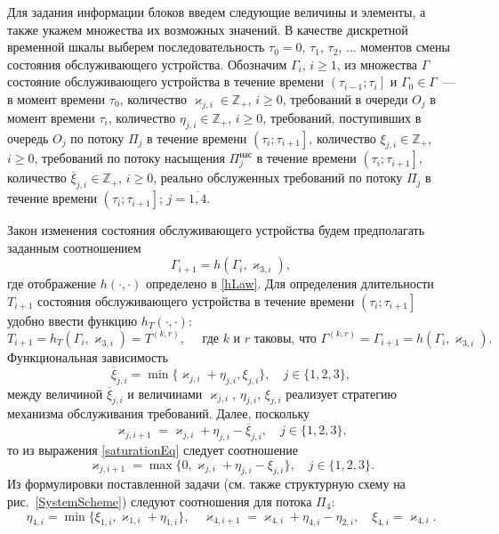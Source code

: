 \documentclass{report}
\begin{document}
Для задания информации блоков введем следующие величины и элементы, а также укажем множества их возможных значений. В качестве дискретной временной шкалы выберем последовательность $\tau_0=0$, $\tau_1$, $\tau_2$, $\ldots$ моментов смены состояния обслуживающего устройства. Обозначим $\Gamma_i$, $i\geqslant 1$, из множества $\Gamma$ состояние обслуживающего устройства в течение времени $\left(\tau_{i-1};\tau_i\right]$ и $\Gamma_0\in \Gamma$~--- в момент времени $\tau_0$, количество $\varkappa_{j,i} \in \mathbb{Z}_+ $, $i\geqslant 0$, требований в очереди $O_j$ в момент времени $\tau_i$, количество $\eta_{j,i} \in \mathbb{Z}_+$, $i\geqslant 0$, требований, поступивших в очередь $O_j$ по потоку $\Pi_j$ в течение времени $\left(\tau_{i};\tau_{i+1}\right]$, количество $\xi_{j,i} \in \mathbb{Z}_+$, $i\geqslant 0$, требований по потоку насыщения $\Pi^{\mathrm{\text{нас}}}_j$ в течение времени $\left(\tau_{i};\tau_{i+1}\right]$, количество $\overline{\xi}_{j,i}\in \mathbb{Z}_+$, $i\geqslant 0$, реально обслуженных требований по потоку $\Pi_j$ в течение времени $\left(\tau_{i};\tau_{i+1}\right]$; $j=\overline{1,4}$.

Закон изменения состояния обслуживающего устройства будем предполагать заданным соотношением 
\begin{equation}
\Gamma_{i+1}=h(\Gamma_i,\varkappa_{3,i}),
\label{gammaFunc}
\end{equation}
где отображение $h(\cdot,\cdot)$ определено в \eqref{hLaw}.
Для определения длительности $T_{i+1}$ состояния обслуживающего устройства в течение времени $\left(\tau_{i};\tau_{i+1}\right]$ удобно ввести функцию $h_T(\cdot,\cdot)$:
\begin{equation*}
T_{i+1}=h_T(\Gamma_i,\varkappa_{3,i})= T^{(k,r)},\quad  \text{ где $k$ и $r$ таковы, что } \Gamma^{(k,r)}=\Gamma_{i+1}=h(\Gamma_i,\varkappa_{3,i}).
\end{equation*}
Функциональная зависимость
\begin{equation}
\overline{\xi}_{j,i}=\min\{\varkappa_{j,i}+\eta_{j,i},\xi_{j,i}\}, \quad j\in \{1,2,3\},
\label{saturationEq}
\end{equation}
между величиной $\overline{\xi}_{j,i}$ и величинами $\varkappa_{j,i}$, $\eta_{j,i}$, $\xi_{j,i}$ реализует стратегию механизма обслуживания требований. Далее, поскольку 
\begin{equation*}
\varkappa_{j,i+1}=\varkappa_{j,i}+\eta_{j,i}-\overline{\xi}_{j,i}, \quad  j\in \{1,2,3\},
\end{equation*}
то из выражения \eqref{saturationEq} следует соотношение
\begin{equation}
\varkappa_{j,i+1}=\max\{{0,\varkappa_{j,i}+\eta_{j,i}-\xi_{j,i}}\}, \quad j\in \{1,2,3\}.
\label{queuesFunc}
\end{equation}
Из формулировки поставленной задачи (см. также структурную схему на рис.~\ref{SystemScheme}) следуют соотношения для потока $\Pi_4$:
\begin{equation}
\eta_{4,i} = \min\{\xi_{1,i}, \varkappa_{1,i}+\eta_{1,i}\}, \quad \varkappa_{4,i+1}=\varkappa_{4,i}+\eta_{4,i}-\eta_{2,i}, \quad \xi_{4,i} = \varkappa_{4,i}.
\label{FourthFunc}
\end{equation}
\end{document}
